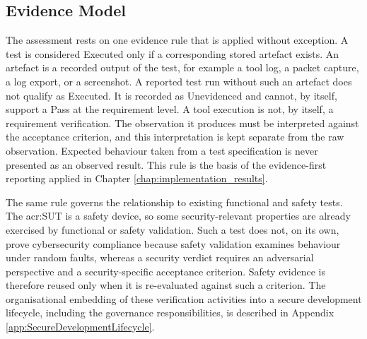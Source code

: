 \subsection{Evidence Model} 
\label{subsec:evidence_model} 

The assessment rests on one evidence rule that is applied without exception. A test is considered Executed only if a corresponding stored artefact exists. An artefact is a recorded output of the test, for example a tool log, a packet capture, a log export, or a screenshot. A reported test run without such an artefact does not qualify as Executed. It is recorded as Unevidenced and cannot, by itself, support a Pass at the requirement level. A tool execution is not, by itself, a requirement verification. The observation it produces must be interpreted against the acceptance criterion, and this interpretation is kept separate from the raw observation. Expected behaviour taken from a test specification is never presented as an observed result. This rule is the basis of the evidence-first reporting applied in Chapter \ref{chap:implementation_results}. 

The same rule governs the relationship to existing functional and safety tests. The \gls{acr:SUT} is a safety device, so some security-relevant properties are already exercised by functional or safety validation. Such a test does not, on its own, prove cybersecurity compliance because safety validation examines behaviour under random faults, whereas a security verdict requires an adversarial perspective and a security-specific acceptance criterion. Safety evidence is therefore reused only when it is re-evaluated against such a criterion. The organisational embedding of these verification activities into a secure development lifecycle, including the governance responsibilities, is described in Appendix \ref{app:SecureDevelopmentLifecycle}.
